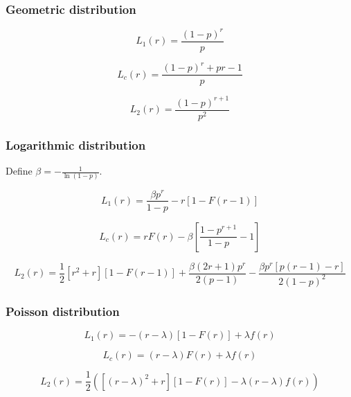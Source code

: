 \documentclass{article}
\begin{document}
\subsubsection{Geometric distribution}

\begin{equation}
    L_1(r) = \frac{(1-p)^r}{p}
\end{equation}

\begin{equation}
    L_c(r) = \frac{(1-p)^r+pr-1}{p}
\end{equation}

\begin{equation}
    L_2(r) = \frac{(1-p)^{r+1}}{p^2}
\end{equation}

\subsubsection{Logarithmic distribution}

Define $\beta = -\frac{1}{\ln(1-p)}$.

\begin{equation}
    L_1(r) = \frac{\beta p^r}{1-p}-r[1-F(r-1)]
\end{equation}

\begin{equation}
    L_c(r) = rF(r) - \beta\left[\frac{1-p^{r+1}}{1-p}-1\right]
\end{equation}

\begin{equation}
    L_2(r) = \frac{1}{2}[r^2+r][1-F(r-1)]+\frac{\beta(2r+1)p^r}{2(p-1)}-\frac{\beta p^r[p(r-1)-r]}{2(1-p)^2}
\end{equation}

\subsubsection{Poisson distribution}

\begin{equation}
    L_1(r) = -(r-\lambda)[1-F(r)]+\lambda f(r)
\end{equation}

\begin{equation}
    L_c(r) = (r-\lambda)F(r)+\lambda f(r)
\end{equation}

\begin{equation}
    L_2(r) = \frac{1}{2}\left([(r-\lambda)^2+r][1-F(r)]-\lambda(r-\lambda)f(r)\right)
\end{equation}
\end{document}

